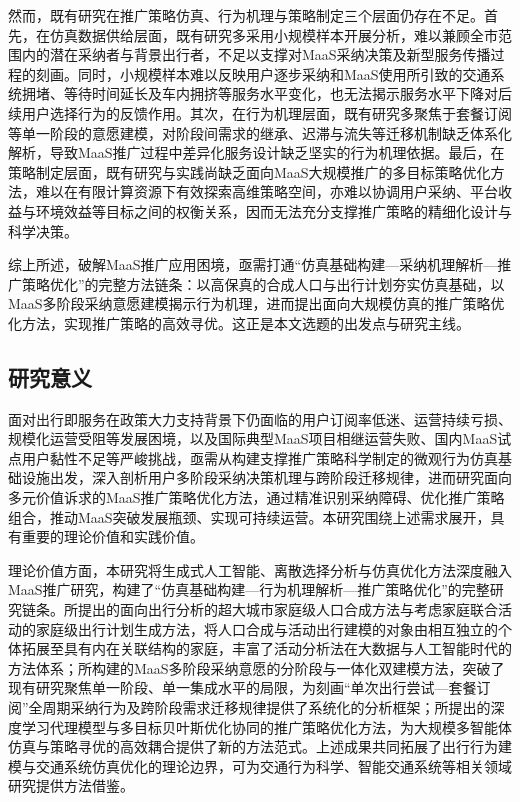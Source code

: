 然而，既有研究在推广策略仿真、行为机理与策略制定三个层面仍存在不足。首先，在仿真数据供给层面，既有研究多采用小规模样本开展分析，难以兼顾全市范围内的潜在采纳者与背景出行者，不足以支撑对MaaS采纳决策及新型服务传播过程的刻画。同时，小规模样本难以反映用户逐步采纳和MaaS使用所引致的交通系统拥堵、等待时间延长及车内拥挤等服务水平变化，也无法揭示服务水平下降对后续用户选择行为的反馈作用。其次，在行为机理层面，既有研究多聚焦于套餐订阅等单一阶段的意愿建模，对阶段间需求的继承、迟滞与流失等迁移机制缺乏体系化解析，导致MaaS推广过程中差异化服务设计缺乏坚实的行为机理依据。最后，在策略制定层面，既有研究与实践尚缺乏面向MaaS大规模推广的多目标策略优化方法，难以在有限计算资源下有效探索高维策略空间，亦难以协调用户采纳、平台收益与环境效益等目标之间的权衡关系，因而无法充分支撑推广策略的精细化设计与科学决策。

综上所述，破解MaaS推广应用困境，亟需打通``仿真基础构建—采纳机理解析—推广策略优化''的完整方法链条：以高保真的合成人口与出行计划夯实仿真基础，以MaaS多阶段采纳意愿建模揭示行为机理，进而提出面向大规模仿真的推广策略优化方法，实现推广策略的高效寻优。这正是本文选题的出发点与研究主线。

\subsection{研究意义}\label{subsec.intro.significance}

面对出行即服务在政策大力支持背景下仍面临的用户订阅率低迷、运营持续亏损、规模化运营受阻等发展困境，以及国际典型MaaS项目相继运营失败、国内MaaS试点用户黏性不足等严峻挑战，亟需从构建支撑推广策略科学制定的微观行为仿真基础设施出发，深入剖析用户多阶段采纳决策机理与跨阶段迁移规律，进而研究面向多元价值诉求的MaaS推广策略优化方法，通过精准识别采纳障碍、优化推广策略组合，推动MaaS突破发展瓶颈、实现可持续运营。本研究围绕上述需求展开，具有重要的理论价值和实践价值。
 
理论价值方面，本研究将生成式人工智能、离散选择分析与仿真优化方法深度融入MaaS推广研究，构建了``仿真基础构建—行为机理解析—推广策略优化''的完整研究链条。所提出的面向出行分析的超大城市家庭级人口合成方法与考虑家庭联合活动的家庭级出行计划生成方法，将人口合成与活动出行建模的对象由相互独立的个体拓展至具有内在关联结构的家庭，丰富了活动分析法在大数据与人工智能时代的方法体系；所构建的MaaS多阶段采纳意愿的分阶段与一体化双建模方法，突破了现有研究聚焦单一阶段、单一集成水平的局限，为刻画``单次出行尝试—套餐订阅''全周期采纳行为及跨阶段需求迁移规律提供了系统化的分析框架；所提出的深度学习代理模型与多目标贝叶斯优化协同的推广策略优化方法，为大规模多智能体仿真与策略寻优的高效耦合提供了新的方法范式。上述成果共同拓展了出行行为建模与交通系统仿真优化的理论边界，可为交通行为科学、智能交通系统等相关领域研究提供方法借鉴。
 
